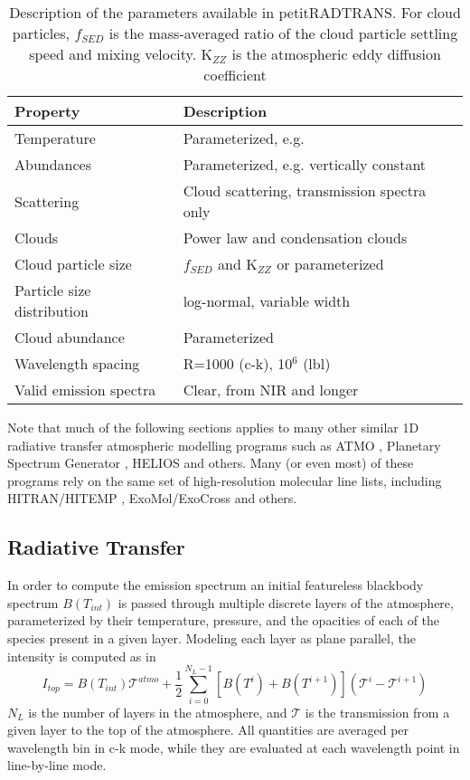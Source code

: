 \begin{table}[t]
	\centering
	\begin{tabular}{ll}
		\toprule
		\textbf{Property} & \textbf{Description}\\
		\midrule
		Temperature & Parameterized, e.g. \parencite{Guillot2010}\\
		Abundances & Parameterized, e.g. vertically constant\\
		Scattering & Cloud scattering, transmission spectra only\\
		Clouds & Power law and condensation clouds\\
		Cloud particle size & $f_{SED}$ and K$_{ZZ}$ or parameterized\\
		Particle size distribution & log-normal, variable width\\
		Cloud abundance & Parameterized\\
		Wavelength spacing & R=1000 (c-k), 10$^{6}$ (lbl)\\
		Valid emission spectra & Clear, from NIR and longer\\
		\bottomrule
	\end{tabular}
	\caption{Description of the parameters available in petitRADTRANS. For cloud particles, $f_{SED}$ is the mass-averaged ratio of the cloud particle settling speed and mixing velocity. K$_{ZZ}$ is the atmospheric eddy diffusion coefficient \parencite{Ackerman2001}}
	\label{tab:petitradparams}
\end{table}

Note that much of the following sections applies to many other similar 1D radiative transfer atmospheric modelling programs such as ATMO \parencite{Goyal2019}, Planetary Spectrum Generator \parencite{Villanueva2018}, HELIOS \parencite{Malik2017,Malik2019} and others.
Many (or even most) of these programs rely on the same set of high-resolution molecular line lists, including HITRAN/HITEMP \parencite{Rothman1981,Rothman2010,Gordon2017}, ExoMol/ExoCross \parencite{Tennyson2016,Tennyson2017,Yurchenko2018} and others. 

\subsection{Radiative Transfer}
In order to compute the emission spectrum an initial featureless blackbody spectrum $B(T_{int})$ is passed through multiple discrete layers of the atmosphere, parameterized by their temperature, pressure, and the opacities of each of the species present in a given layer.
Modeling each layer as plane parallel, the intensity is computed as in \parencite{Irwin2008,Molliere2017,Molliere2019}
\begin{equation}
I_{top} = B(T_{int})\mathcal{T}^{atmo} + \frac{1}{2}\sum_{i=0}^{N_{L}-1}\left[B(T^{i}) + B(T^{i+1})\right]\left(\mathcal{T}^{i}-\mathcal{T}^{i+1}\right)
\end{equation}
$N_{L}$ is the number of layers in the atmosphere, and $\mathcal{T}$ is the transmission from a given layer to the top of the atmosphere. All quantities are averaged per wavelength bin in c-k mode, while they are evaluated at each wavelength point in line-by-line mode.

